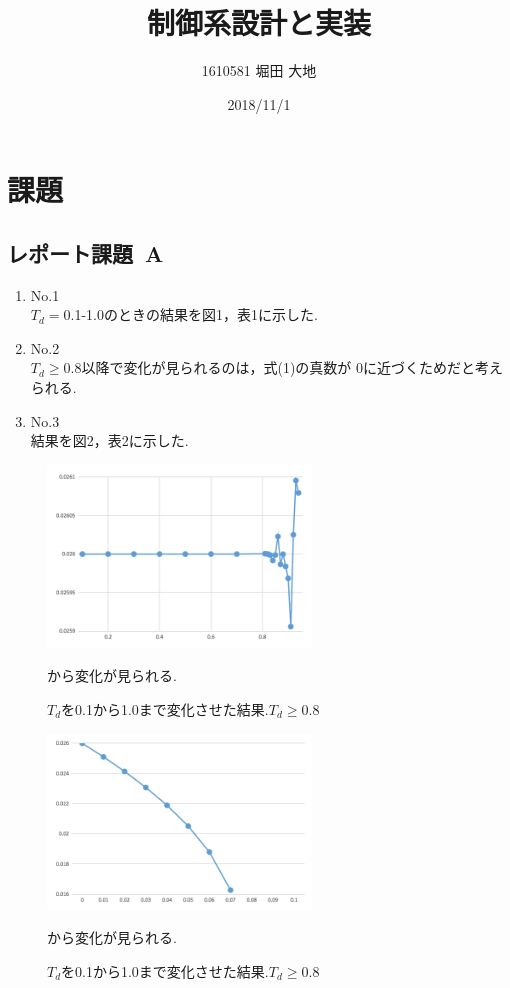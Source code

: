 \documentclass[twocolumn, 10pt,a4j]{jsarticle}
\title{\vspace{-2.5cm}制御系設計と実装}
\author{1610581 堀田 大地}
\date{2018/11/1}
\begin{document}
\maketitle{}
\section{課題}
  \subsection{レポート課題~A}
    \begin{enumerate}
      \item No.1 \\
        $T_{d}=$0.1-1.0のときの結果を図1，表1に示した.  
      \item No.2 \\
        $T_{d} \geq 0.8$以降で変化が見られるのは，式(1)の真数が
        0に近づくためだと考えられる.
      \item No.3 \\
        結果を図2，表2に示した.
    \end{enumerate}
    
    \begin{figure}[H]
      \centering
      \includegraphics[width=7cm]{../img/A-no1.png}
      \caption{$T_{d}$を0.1から1.0まで変化させた結果.$T_{d} \geq 0.8$}から変化が見られる.
    \end{figure}

    \begin{figure}[H]
      \centering
      \includegraphics[width=7cm]{../img/A-no3.png}
      \caption{$T_{d}$を0.1から1.0まで変化させた結果.$T_{d} \geq 0.8$}から変化が見られる.
    \end{figure}
\end{document}
